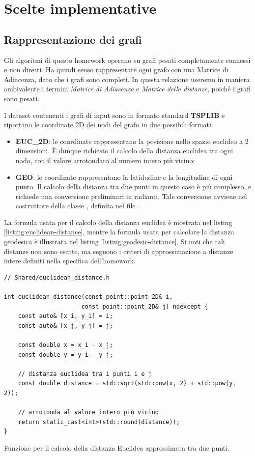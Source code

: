 \section{Scelte implementative}
\label{cap:implementation-choices}

\subsection{Rappresentazione dei grafi}
\label{sub:graph-representation}

Gli algoritmi di questo homework operano su grafi pesati completamente connessi e non diretti. Ha quindi senso rappresentare ogni grafo con una Matrice di Adiacenza, dato che i grafi sono completi. In questa relazione useremo in maniera ambivalente i termini \textit{Matrice di Adiacenza} e \textit{Matrice delle distanze}, poiché i grafi sono pesati.

\noindent I dataset contenenti i grafi di input sono in formato standard \textbf{TSPLIB } e riportano le coordinate 2D dei nodi del grafo in due possibili formati:

\begin{itemize}
    \item \textbf{EUC\_2D}: le coordinate rappresentano la posizione nello spazio euclideo a 2 dimensioni. È dunque richiesto il calcolo della distanza euclidea tra ogni nodo, con il valore arrotondato al numero intero più vicino;
    \item \textbf{GEO}: le coordinate rappresentano la latidudine e la longitudine di ogni punto. Il calcolo della distanza tra due punti in questo caso è più complesso, e richiede una conversione preliminari in radianti. Tale conversione avviene nel costruttore della classe , definita nel file .
\end{itemize}

La formula usata per il calcolo della distanza euclidea è mostrata nel listing \ref{listing:euclidean-distance}, mentre la formula usata per calcolare la distanza geodesica è illustrata nel listing \ref{listing:geodesic-distance}. Si noti che tali distanze non sono esatte, ma seguono i criteri di approssimazione a distanze intere definiti nella specifica dell'homework.

\begin{listing}[!ht]
\begin{verbatim}
// Shared/euclidean_distance.h

int euclidean_distance(const point::point_2D& i,
                      const point::point_2D& j) noexcept {
    const auto& [x_i, y_i] = i;
    const auto& [x_j, y_j] = j;

    const double x = x_i - x_j;
    const double y = y_i - y_j;

    // distanza euclidea tra i punti i e j
    const double distance = std::sqrt(std::pow(x, 2) + std::pow(y, 2));

    // arrotonda al valore intero più vicino
    return static_cast<int>(std::round(distance));
}
\end{verbatim}
\caption{Funzione per il calcolo della distanza Euclidea approssimata tra due punti.}
\label{listing:euclidean-distance}
\end{listing}

